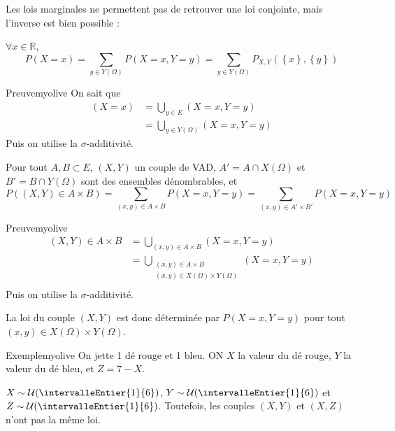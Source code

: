     Les lois marginales ne permettent pas de retrouver une loi conjointe, mais l’inverse est bien possible :

    \begin{prop}{}{}
        $\forall x \in \mathbb{R}$, 
        \[ P(X = x) = \sum_{y \in Y(\Omega)} P(X = x,Y = y) = \sum_{y \in Y(\Omega)} P_{X,Y} (\left\{x\right\}, \left\{y\right\}) \] 
    \end{prop}

    \begin{demo}{Preuve}{myolive}
        On sait que 
        \begin{align*}
            (X = x) &= \bigcup_{y \in E} (X = x, Y = y) \\
            &= \bigcup_{y \in Y(\Omega)} (X = x, Y = y)
        \end{align*}
        Puis on utilise la $\sigma$-additivité.
    \end{demo}

    \begin{prop}{}{}
        Pour tout $A,B \subset E$, $(X,Y)$ un couple de VAD, $A' = A \cap X(\Omega)$ et $B' = B \cap Y(\Omega)$ sont des ensembles dénombrables, et 
        \[ P((X,Y) \in A \times B) = \sum_{(x,y) \in A \times B} P(X=x,Y=y) = \sum_{(x,y) \in A'\times B'} P(X=x,Y=y) \]   
    \end{prop}

    \begin{demo}{Preuve}{myolive}
        \begin{align*}
            (X,Y) \in A \times B &= \bigcup_{(x,y) \in A \times B} (X = x, Y = y) \\
            &= \bigcup_{\substack{(x,y) \in A \times B \\ (x,y) \in X(\Omega) \times Y(\Omega)}} (X = x, Y = y) \\
        \end{align*}
        Puis on utilise la $\sigma$-additivité.
    \end{demo}

    La loi du couple $(X,Y)$ est donc déterminée par $P(X=x,Y=y)$ pour tout $(x,y) \in X(\Omega) \times Y(\Omega)$.

    \begin{omed}{Exemple}{myolive}
        On jette 1 dé rouge et 1 bleu. ON $X$ la valeur du dé rouge, $Y$ la valeur du dé bleu, et $Z = 7 - X$. 

        $X \sim \mathcal{U}(\intervalleEntier{1}{6})$, $Y \sim \mathcal{U}(\intervalleEntier{1}{6})$ et $Z \sim \mathcal{U}(\intervalleEntier{1}{6})$. Toutefois, les couples $(X,Y)$ et $(X,Z)$ n’ont pas la même loi.
    \end{omed}

